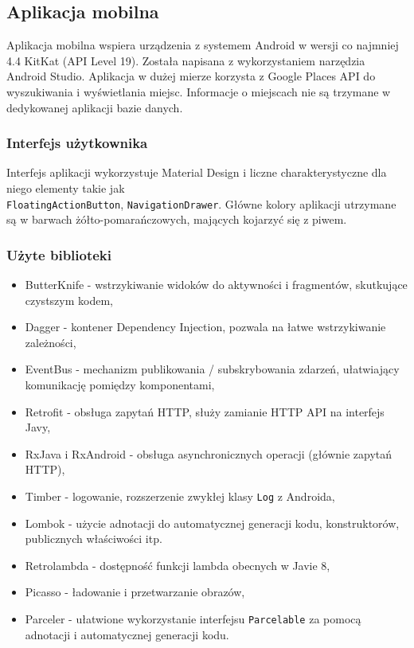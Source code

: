 \documentclass[a4paper]{article}
\begin{document}
\subsection{Aplikacja mobilna}
Aplikacja mobilna wspiera urządzenia z systemem Android w wersji co najmniej 4.4 KitKat (API Level 19). Została napisana z wykorzystaniem narzędzia Android Studio. Aplikacja w dużej mierze korzysta z Google Places API do wyszukiwania i wyświetlania miejsc. Informacje o miejscach nie są trzymane w dedykowanej aplikacji bazie danych.

\subsubsection{Interfejs użytkownika}
Interfejs aplikacji wykorzystuje Material Design i liczne charakterystyczne dla niego elementy takie jak \\ \texttt{FloatingActionButton}, \texttt{NavigationDrawer}. Główne kolory aplikacji utrzymane są w barwach żółto-pomarańczowych, mających kojarzyć się z piwem.

\subsubsection{Użyte biblioteki}
\begin{itemize}
\item ButterKnife - wstrzykiwanie widoków do aktywności i fragmentów, skutkujące czystszym kodem,
\item Dagger - kontener Dependency Injection, pozwala na łatwe wstrzykiwanie zależności,
\item EventBus - mechanizm publikowania / subskrybowania zdarzeń, ułatwiający komunikację pomiędzy komponentami,
\item Retrofit - obsługa zapytań HTTP, służy zamianie HTTP API na interfejs Javy,
\item RxJava i RxAndroid - obsługa asynchronicznych operacji (głównie zapytań HTTP),
\item Timber - logowanie, rozszerzenie zwykłej klasy \texttt{Log} z Androida,
\item Lombok - użycie adnotacji do automatycznej generacji kodu, konstruktorów, publicznych właściwości itp. 
\item Retrolambda - dostępność funkcji lambda obecnych w Javie 8,
\item Picasso - ładowanie i przetwarzanie obrazów,
\item Parceler - ułatwione wykorzystanie interfejsu \texttt{Parcelable} za pomocą adnotacji i automatycznej generacji kodu.
\end{itemize}
\end{document}
